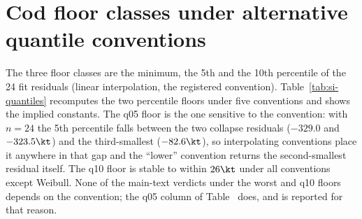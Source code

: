 \section{Cod floor classes under alternative quantile conventions}\label{si:quantiles}
The three floor classes are the minimum, the 5th and the 10th percentile of the 24 fit residuals (linear interpolation, the registered convention). Table~\ref{tab:si-quantiles} recomputes the two percentile floors under five conventions and shows the implied constants. The q05 floor is the one sensitive to the convention: with $n=24$ the 5th percentile falls between the two collapse residuals ($-329.0$ and $-323.5\kt$) and the third-smallest ($-82.6\kt$), so interpolating conventions place it anywhere in that gap and the ``lower'' convention returns the second-smallest residual itself. The q10 floor is stable to within $26\kt$ under all conventions except Weibull. None of the main-text verdicts under the worst and q10 floors depends on the convention; the q05 column of Table~ does, and is reported for that reason.

